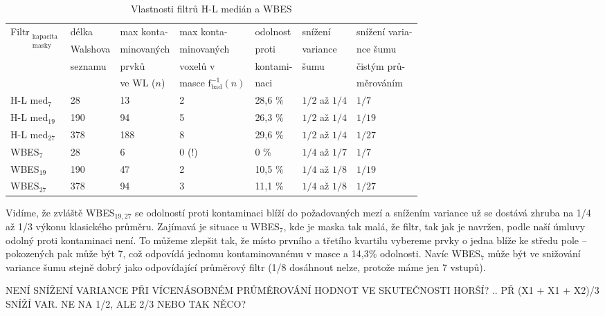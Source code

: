 \begin{table}[h]
    \hspace{-0.6cm}
    \begin{tabular}{lllllll}
      \toprule
      \multirow{4}{*}{Filtr$_{\mathrm{\substack{kapacita\\ masky}}}$} &délka&max konta-& max konta- & odolnost    & snížení    & snížení varia- \\
                                        &Walshova& minovaných & minovaných & proti       & variance   & nce šumu      \\
                                        &seznamu& prvků       & voxelů v   & kontami-    & šumu       & čistým prů-     \\
                                        &       & ve WL ($n$) & masce $\mathrm{f_{bad}^{-1}}(n)$ & naci &  & měrováním  \\
      \midrule
      H-L med$_{\mathrm{7}}$            & 28  & 13  & 2                 & 28,6 \%       & $1/2$ až $1/4$    & $1/7$ \\
      H-L med$_{\mathrm{19}}$           & 190 & 94  & 5                 & 26,3 \%       & $1/2$ až $1/4$    & $1/19$ \\
      H-L med$_{\mathrm{27}}$           & 378 & 188 & 8                 & 29,6 \%       & $1/2$ až $1/4$    & $1/27$  \\
      WBES$_{\mathrm{7}}$               & 28  & 6   & 0 (!)             & 0 \%          & $1/4$ až $1/7$    & $1/7$ \\
      WBES$_{\mathrm{19}}$              & 190 & 47  & 2                 & 10,5 \%       & $1/4$ až $1/8$    & $1/19$ \\
      WBES$_{\mathrm{27}}$              & 378 & 94  & 3                 & 11,1 \%       & $1/4$ až $1/8$    & $1/27$ \\
      \bottomrule
    \end{tabular}
    \caption{Vlastnosti filtrů H-L medián a WBES}
\end{table}\label{tab WBES}

     Vidíme, že zvláště WBES$_{\mathrm{19,27}}$ se odolností proti kontaminaci blíží do požadovaných mezí a snížením variance už se dostává zhruba na 1/4 až 1/3 výkonu klasického průměru. Zajímavá je situace u WBES$_{\mathrm{7}}$, kde je maska tak malá, že filtr, tak jak je navržen, podle naší úmluvy odolný proti kontaminaci není. To můžeme zlepšit tak, že místo prvního a třetího kvartilu vybereme prvky o jedna blíže ke středu pole -- pokozených pak může být 7, což odpovídá jednomu kontaminovanému v masce a 14,3\% odolnosti. Navíc WBES$_{\mathrm{7}}$ může být ve snižování variance šumu stejně dobrý jako odpovídající průměrový filtr (1/8 dosáhnout nelze, protože máme jen 7 vstupů).
     
     NENÍ SNÍŽENÍ VARIANCE PŘI VÍCENÁSOBNÉM PRŮMĚROVÁNÍ HODNOT VE SKUTEČNOSTI HORŠÍ? .. PŘ (X1 + X1 + X2)/3 SNÍŽÍ VAR. NE NA 1/2, ALE 2/3 NEBO TAK NĚCO?
